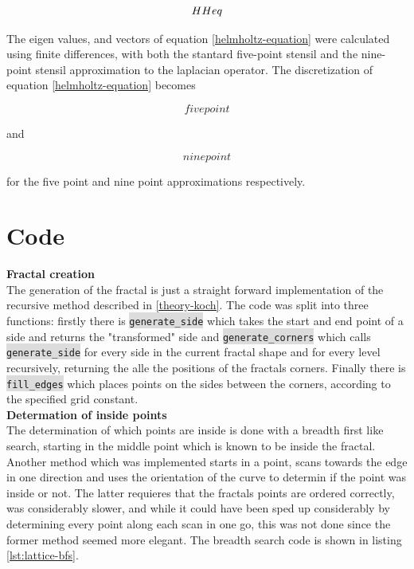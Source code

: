 \documentclass{article}
\begin{document}
\begin{equation}
    HHeq \\
\end{equation}

The eigen values, and vectors of equation \ref{helmholtz-equation} were calculated using finite differences, with both the stantard five-point stensil and the nine-point stensil approximation to the laplacian operator. The discretization of equation \ref{helmholtz-equation} becomes

\begin{equation}
    five point
\end{equation}

and

\begin{equation}
    nine point
\end{equation}

for the five point and nine point approximations respectively.

\section{Code}
\noindent
\textbf{Fractal creation}\\
The generation of the fractal is just a straight forward implementation of the recursive method described in \ref{theory-koch}. The code was split into three functions: firstly there is \colorbox{gainsboro}{\lstinline{generate_side}} which takes the start and end point of a side and returns the "transformed" side and \colorbox{gainsboro}{\lstinline{generate_corners}} which calls \colorbox{gainsboro}{\lstinline{generate_side}} for every side in the current fractal shape and for every level recursively, returning the alle the positions of the fractals corners.
Finally there is \colorbox{gainsboro}{\lstinline{fill_edges}} which places points on the sides between the corners, according to the specified grid constant.\\

\noindent
\textbf{Determation of inside points}\\
The determination of which points are inside is done with a breadth first like search, starting in the middle point which is known to be inside the fractal. Another method which was implemented starts in a point, scans towards the edge in one direction and uses the orientation of the curve to determin if the point was inside or not. The latter requieres that the fractals points are ordered correctly, was considerably slower, and while it could have been sped up considerably by determining every point along each scan in one go, this was not done
since the former method seemed more elegant. The breadth search code is shown in listing \ref{lst:lattice-bfs}.\\
\end{document}
